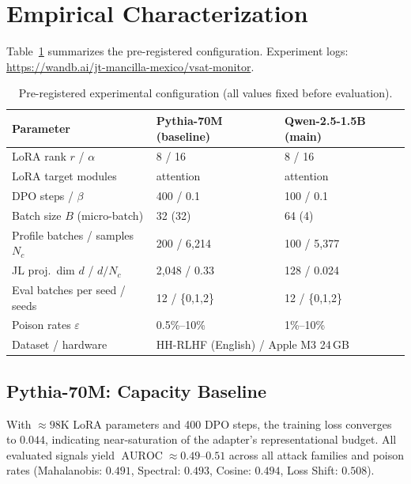 \documentclass[runningheads]{llncs}
\DeclareMathOperator{\AUROC}{AUROC}
\begin{document}
\section{Empirical Characterization}\label{sec:empirical}

Table~\ref{tab:setup} summarizes the pre-registered configuration.
Experiment logs: \url{https://wandb.ai/jt-mancilla-mexico/vsat-monitor}.

\begin{table}[t]
\centering
\caption{Pre-registered experimental configuration (all values fixed before
  evaluation).}
\label{tab:setup}
\footnotesize
\setlength{\tabcolsep}{3pt}
\begin{tabular}{@{}lll@{}}
\toprule
\textbf{Parameter} & \textbf{Pythia-70M (baseline)} & \textbf{Qwen-2.5-1.5B (main)} \\
\midrule
LoRA rank $r$ / $\alpha$         & 8 / 16   & 8 / 16   \\
LoRA target modules              & attention & attention \\
DPO steps / $\beta$              & 400 / 0.1 & 100 / 0.1 \\
Batch size $B$ (micro-batch)     & 32 (32)  & 64 (4)   \\
Profile batches / samples $N_c$  & 200 / 6{,}214 & 100 / 5{,}377 \\
JL proj.\ dim $d$ / $d/N_c$     & 2{,}048 / 0.33 & 128 / 0.024 \\
Eval batches per seed / seeds    & 12 / \{0,1,2\} & 12 / \{0,1,2\} \\
Poison rates $\varepsilon$       & 0.5\%--10\% & 1\%--10\% \\
Dataset / hardware               & \multicolumn{2}{l}{HH-RLHF (English) / Apple M3 24\,GB} \\
\bottomrule
\end{tabular}
\end{table}

\subsection{Pythia-70M: Capacity Baseline}

With $\approx 98$K LoRA parameters and 400 DPO steps, the training loss
converges to $0.044$, indicating near-saturation of the adapter's
representational budget. All evaluated signals yield
$\AUROC \approx 0.49$--$0.51$ across all attack families and poison rates
(Mahalanobis: $0.491$, Spectral: $0.493$, Cosine: $0.494$, Loss Shift: $0.508$).
\end{document}
